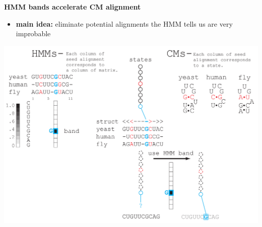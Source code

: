 \documentclass[landscape]{slides}
\begin{document}
\begin{slide}
\begin{center}

\textbf{HMM bands accelerate CM alignment}
\end{center}
\medskip
\small
\begin{itemize}
\item
\textbf{main idea:} eliminate potential alignments the HMM tells us are very improbable
\end{itemize}
\begin{center}
\includegraphics[width=8in]{figs/post_hmm_to_cm_map2_layer13}
\end{center}
\vfill
\end{slide}
\end{document}
